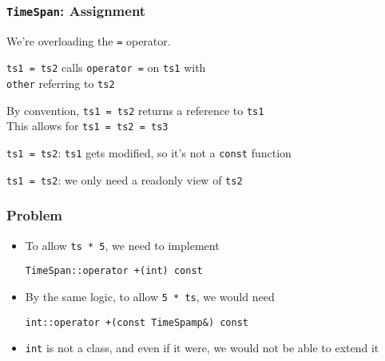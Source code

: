 \documentclass{../ucll-slides}
\begin{document}
\begin{frame}
  \frametitle{{\tt TimeSpan}: Assignment}

  
  \begin{overprint}
    \begin{center}
      We're overloading the {\tt =} operator.
    \end{center}

    \begin{center}
      {\tt ts1 = ts2} calls {\tt operator =} on {\tt ts1} with \\ {\tt other} referring to {\tt ts2}
    \end{center}

    \begin{center}
      By convention, {\tt ts1 = ts2} returns a reference to {\tt ts1} \\
      This allows for {\tt ts1 = ts2 = ts3}
    \end{center}

    \begin{center}
      {\tt ts1 = ts2}: {\tt ts1} gets modified, so it's not a {\tt const} function
    \end{center}

    \begin{center}
      {\tt ts1 = ts2}: we only need a readonly view of {\tt ts2}
    \end{center}
  \end{overprint}
\end{frame}

\begin{frame}
  \frametitle{Problem}
  \begin{itemize}
    \item To allow {\tt ts * 5}, we need to implement
          \begin{center}
            \tt TimeSpan::operator +(int) const
          \end{center}
    \item By the same logic, to allow {\tt 5 * ts}, we would need
          \begin{center}
            \tt int::operator +(const TimeSpamp\&) const
          \end{center}
    \item {\tt int} is not a class, and even if it were, we
          would not be able to extend it
  \end{itemize}
\end{frame}
\end{document}
